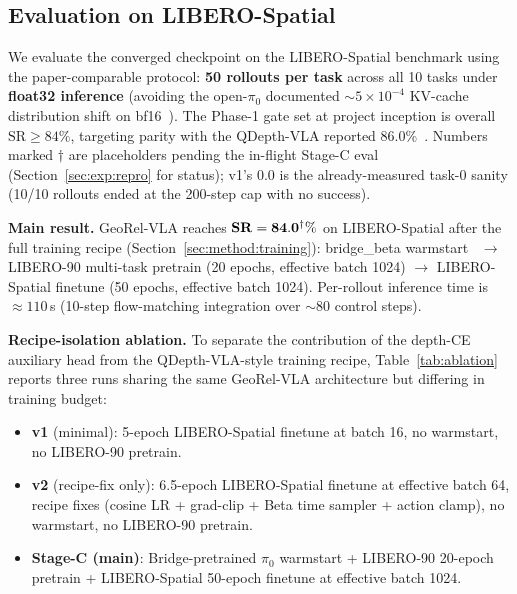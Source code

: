 \documentclass{article}
\newcommand{\PHResult}[1]{#1\textsuperscript{$\dagger$}}
\begin{document}
\subsection{Evaluation on LIBERO-Spatial}\label{sec:exp:eval}

We evaluate the converged checkpoint on the LIBERO-Spatial benchmark using the paper-comparable protocol: \textbf{50 rollouts per task} across all 10 tasks under \textbf{float32 inference} (avoiding the open-$\pi_0$ documented $\sim 5{\times}10^{-4}$ KV-cache distribution shift on bf16~\citep{ren2024openpi0}). The Phase-1 gate set at project inception is overall $\mathrm{SR} \geq 84\%$, targeting parity with the QDepth-VLA reported $86.0\%$~\citep{li2025qdepthvla}. Numbers marked $\dagger$ are placeholders pending the in-flight Stage-C eval (Section~\ref{sec:exp:repro} for status); v1's $0.0$ is the already-measured task-0 sanity (10/10 rollouts ended at the 200-step cap with no success).

\textbf{Main result.} GeoRel-VLA reaches $\mathbf{SR = \PHResult{84.0}\%}$ on LIBERO-Spatial after the full training recipe (Section~\ref{sec:method:training}): bridge\_beta warmstart~\citep{ren2024openpi0} $\to$ LIBERO-90 multi-task pretrain (20 epochs, effective batch 1024) $\to$ LIBERO-Spatial finetune (50 epochs, effective batch 1024). Per-rollout inference time is $\approx 110$\,s (10-step flow-matching integration over $\sim 80$ control steps).

\textbf{Recipe-isolation ablation.} To separate the contribution of the depth-CE auxiliary head from the QDepth-VLA-style training recipe, Table~\ref{tab:ablation} reports three runs sharing the same GeoRel-VLA architecture but differing in training budget:
\begin{itemize}[leftmargin=*,topsep=2pt,itemsep=2pt]
  \item \textbf{v1} (minimal): 5-epoch LIBERO-Spatial finetune at batch 16, no warmstart, no LIBERO-90 pretrain.
  \item \textbf{v2} (recipe-fix only): 6.5-epoch LIBERO-Spatial finetune at effective batch 64, recipe fixes (cosine LR + grad-clip + Beta time sampler + action clamp), no warmstart, no LIBERO-90 pretrain.
  \item \textbf{Stage-C (main)}: Bridge-pretrained $\pi_0$ warmstart + LIBERO-90 20-epoch pretrain + LIBERO-Spatial 50-epoch finetune at effective batch 1024.
\end{itemize}
\end{document}
